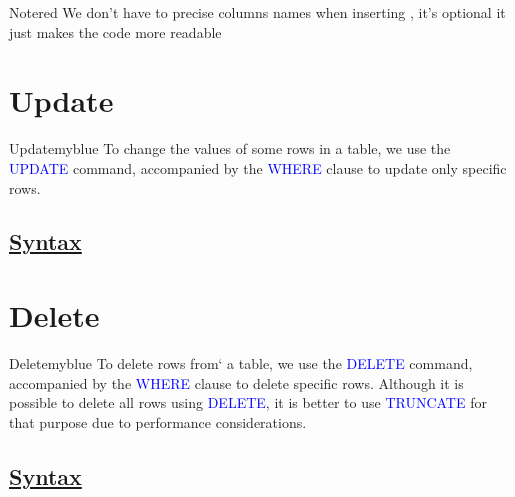 \vspace{0.25cm}

\begin{prettyBox}{Note}{red}
We don't have to precise columns names when inserting , it's optional it just makes the code more readable
\end{prettyBox}

\vspace{0.25cm}
\section{Update}
\begin{prettyBox}{Update}{myblue}
To change the values of some rows in a table, we use the \textcolor{blue}{UPDATE} command, accompanied by the \textcolor{blue}{WHERE} clause to update only specific rows.
\end{prettyBox}

\subsection*{\underline{\textbf{Syntax}}}


\section{Delete} 

\begin{prettyBox}{Delete}{myblue}
To delete rows from` a table, we use the \textcolor{blue}{DELETE} command, accompanied by the \textcolor{blue}{WHERE} clause to delete specific rows. Although it is possible to delete all rows using \textcolor{blue}{DELETE}, it is better to use \textcolor{blue}{TRUNCATE} for that purpose due to performance considerations.
\end{prettyBox}

\subsection*{\underline{\textbf{Syntax}}}


